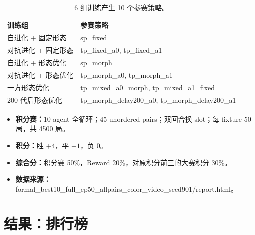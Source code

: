 \documentclass[final]{beamer}
\newcommand{\agent}[1]{{\ttfamily\scriptsize #1}}
\begin{document}
\begin{frame}[t]
\begin{multicols}{3}
\begin{table}
\centering
\scriptsize
\caption{6 组训练产生 10 个参赛策略。}
\begin{tabularx}{\columnwidth}{@{}lY@{}}
\toprule
训练组 & 参赛策略\\
\midrule
自进化 + 固定形态 & \agent{sp\_fixed}\\
对抗进化 + 固定形态 & \agent{tp\_fixed\_a0}, \agent{tp\_fixed\_a1}\\
自进化 + 形态优化 & \agent{sp\_morph}\\
对抗进化 + 形态优化 & \agent{tp\_morph\_a0}, \agent{tp\_morph\_a1}\\
一方形态优化 & \agent{tp\_mixed\_a0\_morph}, \agent{tp\_mixed\_a1\_fixed}\\
200 代后形态优化 & \agent{tp\_morph\_delay200\_a0}, \agent{tp\_morph\_delay200\_a1}\\
\bottomrule
\end{tabularx}
\end{table}

\begin{itemize}
  \item \textbf{积分赛：}10 agent 全循环；45 unordered pairs；双回合换 slot；每 fixture 50 局，共 4500 局。
  \item \textbf{积分：}胜 $+4$，平 $+1$，负 $0$。
  \item \textbf{综合分：}积分赛 50\%，Reward 20\%，对原积分前三的大赛积分 30\%。
  \item \textbf{数据来源：}\agent{formal\_best10\_full\_ep50\_allpairs\_color\_video\_seed901/report.html}。
\end{itemize}

\section{结果：排行榜}


\end{multicols}
\end{frame}
\end{document}
